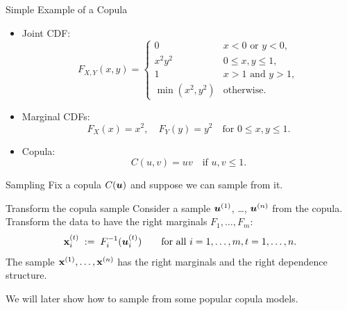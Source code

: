 \documentclass[11pt,handout,aspectratio=169]{beamer}
\begin{document}
\begin{frame}{Simple Example of a Copula}
\begin{itemize}
    \item Joint CDF:
    \[ F_{X,Y}(x, y) =
    \begin{cases} 
    0 & x < 0 \text{ or } y < 0, \\
    x^2 y^2 & 0 \leq x, y \leq 1, \\
    1 & x > 1 \text{ and } y > 1, \\
    \min(x^2, y^2) & \text{otherwise}.
    \end{cases} \]
    \item Marginal CDFs:
    \[ F_X(x) = x^2, \quad F_Y(y) = y^2 \quad \text{for } 0 \leq x, y \leq 1. \]
    \item Copula:
    \[ C(u, v) = uv \quad \text{if } u, v \leq 1. \]
\end{itemize}
\end{frame}


\begin{frame}{Sampling}
	Fix a copula $C(\boldsymbol u)$ and suppose we can sample from it.
	\begin{block}{Transform the copula sample}
		Consider a sample $\boldsymbol u^{(1)}$, \ldots, $\boldsymbol u^{(n)}$ from the copula.\\[3mm]
		
		Transform the data to have the right marginals $F_1,\ldots,F_m$:
		$$
		\mathbf{x}^{(t)}_i \;:=\; F_i^{-1}(\boldsymbol u^{(t)}_i)\qquad\mbox{for all }i=1,\ldots,m, t=1,\ldots,n.
		$$
		The sample $\mathbf{x}^{(1)},\ldots,\mathbf{x}^{(n)}$ has the right marginals and the right dependence structure. 
	\end{block}
	\medskip
	We will later show how to sample from some popular copula models. 
\end{frame}
\end{document}
